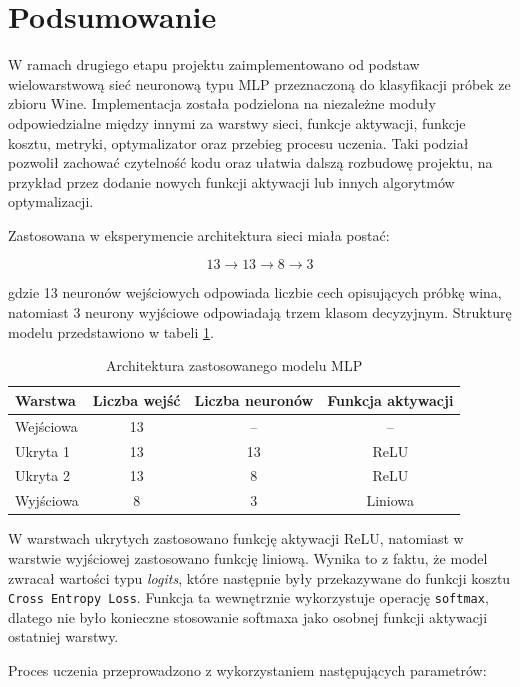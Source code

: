 \section{Podsumowanie}

W ramach drugiego etapu projektu zaimplementowano od podstaw wielowarstwową
sieć neuronową typu MLP przeznaczoną do klasyfikacji próbek ze zbioru Wine.
Implementacja została podzielona na niezależne moduły odpowiedzialne między
innymi za warstwy sieci, funkcje aktywacji, funkcje kosztu, metryki,
optymalizator oraz przebieg procesu uczenia. Taki podział pozwolił zachować
czytelność kodu oraz ułatwia dalszą rozbudowę projektu, na przykład przez
dodanie nowych funkcji aktywacji lub innych algorytmów optymalizacji.

Zastosowana w eksperymencie architektura sieci miała postać:

\[
    13 \rightarrow 13 \rightarrow 8 \rightarrow 3
\]

gdzie 13 neuronów wejściowych odpowiada liczbie cech opisujących próbkę
wina, natomiast 3 neurony wyjściowe odpowiadają trzem klasom decyzyjnym.
Strukturę modelu przedstawiono w tabeli \ref{tab:model_architecture}.

\begin{table}[H]
    \centering
    \begin{tabular}{lccc}
        \hline
        Warstwa & Liczba wejść & Liczba neuronów & Funkcja aktywacji \\
        \hline
        Wejściowa & 13 & -- & -- \\
        Ukryta 1 & 13 & 13 & ReLU \\
        Ukryta 2 & 13 & 8 & ReLU \\
        Wyjściowa & 8 & 3 & Liniowa \\
        \hline
    \end{tabular}
    \caption{Architektura zastosowanego modelu MLP}
    \label{tab:model_architecture}
\end{table}

W warstwach ukrytych zastosowano funkcję aktywacji ReLU, natomiast w warstwie
wyjściowej zastosowano funkcję liniową. Wynika to z faktu, że model zwracał
wartości typu \textit{logits}, które następnie były przekazywane do funkcji
kosztu \texttt{Cross Entropy Loss}. Funkcja ta wewnętrznie wykorzystuje
operację \texttt{softmax}, dlatego nie było konieczne stosowanie softmaxa
jako osobnej funkcji aktywacji ostatniej warstwy.

Proces uczenia przeprowadzono z wykorzystaniem następujących parametrów:

